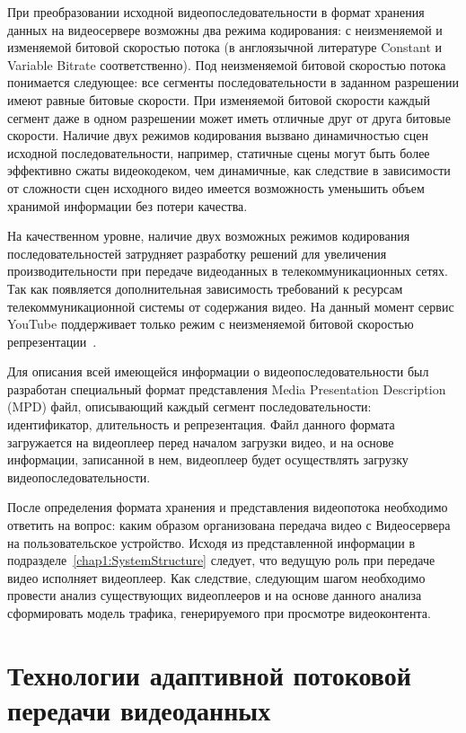 При преобразовании исходной видеопоследовательности в формат хранения данных на видеосервере возможны два режима кодирования: с неизменяемой и изменяемой битовой скоростью потока (в англоязычной литературе Constant и Variable Bitrate соответственно). Под неизменяемой битовой скоростью потока понимается следующее: все сегменты последовательности в заданном разрешении имеют равные битовые скорости. При изменяемой битовой скорости каждый сегмент даже в одном разрешении может иметь отличные друг от друга битовые скорости. Наличие двух режимов кодирования вызвано динамичностью сцен исходной последовательности, например, статичные сцены могут быть более эффективно сжаты видеокодеком, чем динамичные, как следствие в зависимости от сложности сцен исходного видео имеется возможность уменьшить объем хранимой информации без потери качества.

На качественном уровне, наличие двух возможных режимов кодирования последовательностей затрудняет разработку решений для увеличения производительности при передаче видеоданных в телекоммуникационных сетях. Так как появляется дополнительная зависимость требований к ресурсам телекоммуникационной системы от содержания видео. На данный момент сервис YouTube поддерживает только режим с неизменяемой битовой скоростью репрезентации~\cite{YouTubeBR}.

Для описания всей имеющейся информации о видеопоследовательности был разработан специальный формат представления Media Presentation Description (MPD) файл, описывающий каждый сегмент последовательности: идентификатор, длительность и репрезентация. Файл данного формата загружается на видеоплеер перед началом загрузки видео, и на основе информации, записанной в нем, видеоплеер будет осуществлять загрузку видеопоследовательности.

После определения формата хранения и представления видеопотока необходимо ответить на вопрос: каким образом организована передача видео с Видеосервера на пользовательское устройство. Исходя из представленной информации в подразделе~\ref{chap1:SystemStructure} следует, что ведущую роль при передаче видео исполняет видеоплеер. Как следствие, следующим шагом необходимо провести анализ существующих видеоплееров и на основе данного анализа сформировать модель трафика, генерируемого при просмотре видеоконтента.

\section{Технологии адаптивной потоковой передачи видеоданных}
\label{chap1:VideoPlayers}

